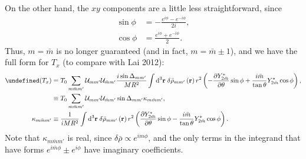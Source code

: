 \documentclass[12pt]{article}
\newcommand*{\pd}[2]{\frac{\partial#1}{\partial#2}}
\newcommand*{\bm}[1]{\boldsymbol{\mathbf{#1}}}
\newcommand*{\p}[1]{\left(#1\right)}
\let\Re\undefined
\DeclareMathOperator{\Re}{Re}
\begin{document}
On the other hand, the $xy$ components are a little less straightforward, since
\begin{align}
    \sin\phi &= -\frac{e^{i\phi} - e^{-i\phi}}{2i},\\
    \cos\phi &= \frac{e^{i\phi} + e^{-i\phi}}{2}.
\end{align}
Thus, $m=\bar{m}$ is no longer guaranteed (and in fact, $m = \bar{m} \pm 1$),
and we have the full form for $T_x$ (to compare with Lai 2012):
\begin{align}
    \Re(T_x)
        &=
            T_0
            \sum\limits_{m\bar{m}m'}
            \mathcal{U}_{mm'}
            \mathcal{U}_{\bar{m}m'}
            \frac{i\sin \Delta_{mm'}}{MR^2}
            \int\limits\mathrm{d}^3\bm{r}\;
                \delta\bar{\rho}_{mm'}\p{\bm{r}}
                r^2
                \p{
                    -\pd{Y^*_{2\bar{m}}}{\theta}\sin\phi
                    + \frac{i\bar{m}}{\tan \theta}
                        Y^*_{2\bar{m}}\cos\phi
                },\\
        &\equiv
            T_0
            \sum\limits_{m\bar{m}m'}
            \mathcal{U}_{mm'}
            \mathcal{U}_{\bar{m}m'}
            \sin \Delta_{mm'}
            \kappa_{m\bar{m}m'},\\
    \kappa_{m\bar{m}m'}
        &\equiv
            \frac{1}{iMR^2}
            \int\limits\mathrm{d}^3\bm{r}\;
                \delta\bar{\rho}_{mm'}\p{\bm{r}}
                r^2
                \p{
                    \pd{Y^*_{2\bar{m}}}{\theta}\sin\phi
                    - \frac{i\bar{m}}{\tan \theta}
                        Y^*_{2\bar{m}}\cos\phi
                }.
\end{align}
Note that $\kappa_{m\bar{m}m'}$ is real, since $\delta\bar{\rho} \propto
e^{im\phi}$, and the only terms in the integrand that have forms
$e^{i\bar{m}\phi} \pm e^{i\phi}$ have imaginary coefficients.
\end{document}
